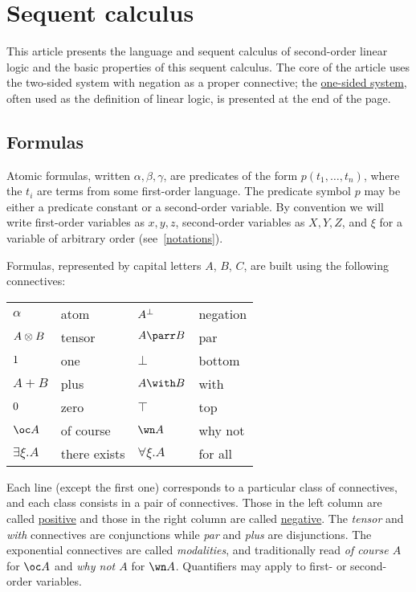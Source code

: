 \chapter{Sequent calculus}\label{sequent-calculus}

This article presents the language and sequent calculus of second-order
linear logic and the basic properties of this sequent calculus. The core
of the article uses the two-sided system with negation as a proper
connective; the \hyperref[one-sided-sequent-calculus]{one-sided
system}, often used as the definition of linear logic, is presented at
the end of the page.

\section{Formulas}\label{formulas}

Atomic formulas, written \(\alpha,\beta,\gamma\), are predicates of the
form \(p(t_1,\ldots,t_n)\), where the \(t_i\) are terms from some
first-order language. The predicate symbol \(p\) may be either a
predicate constant or a second-order variable. By convention we will
write first-order variables as \(x,y,z\), second-order variables as
\(X,Y,Z\), and \(\xi\) for a variable of arbitrary order (see~\cref{notations}).

Formulas, represented by capital letters \(A\), \(B\), \(C\), are built
using the following connectives:

\begin{longtable}[]{@{}llll@{}}
\toprule
\(\alpha\) & atom & \(A^\bot\) & negation\tabularnewline
\(A \otimes B\) & tensor & \(A \parr B\) & par\tabularnewline
\(1\) & one & \(\bot\) & bottom\tabularnewline
\(A \plus B\) & plus & \(A \with B\) & with\tabularnewline
\(0\) & zero & \(\top\) & top\tabularnewline
\(\oc A\) & of course & \(\wn A\) & why not\tabularnewline
\(\exists \xi.A\) & there exists & \(\forall \xi.A\) & for
all\tabularnewline
\bottomrule
\end{longtable}

Each line (except the first one) corresponds to a particular class of
connectives, and each class consists in a pair of connectives. Those in
the left column are called \hyperref[positive-formula]{positive} and those
in the right column are called \hyperref[negative-formula]{negative}. The
\emph{tensor} and \emph{with} connectives are conjunctions while
\emph{par} and \emph{plus} are disjunctions. The exponential connectives
are called \emph{modalities}, and traditionally read \emph{of course
\(A\)} for \(\oc A\) and \emph{why not \(A\)} for \(\wn A\). Quantifiers
may apply to first- or second-order variables.

